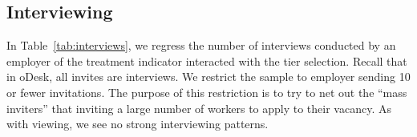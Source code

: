 \documentclass[prodmode,acmec]{ec-acmsmall}
\newcommand{\important}[1]{#1}
\begin{document}
\subsection{Interviewing} 
In Table~\ref{tab:interviews}, we regress the number of interviews conducted by an employer of the treatment indicator interacted with the tier selection. 
Recall that in oDesk, all invites are interviews. 
We restrict the sample to employer sending 10 or fewer invitations. 
The purpose of this restriction is to try to net out the ``mass inviters'' that inviting a large number of workers to apply to their vacancy. 
As with viewing, we see no strong interviewing patterns.






 
\end{document}
